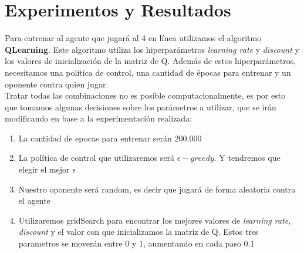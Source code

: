 \section{Experimentos y Resultados}
%
%
%
%
%


Para entrenar al agente que jugará al 4 en línea utilizamos el algoritmo \textbf{QLearning}. Este algoritmo utiliza los hiperparámetros \textit{learning rate} y \textit{discount} y los valores de inicialización de la matriz de Q. Además de estos hiperparámetros, necesitamos una política de control, una cantidad de épocas para entrenar y un oponente contra quien jugar.  \\

Tratar todas las combinaciones no es posible computacionalmente, es por esto que tomamos algunas decisiones sobre los parámetros a utilizar, que se irán modificando en base a la experimentación realizada:

\begin{enumerate}
\item La cantidad de epocas para entrenar serán 200.000
\item La política de control que utilizaremos será \textbf{$\epsilon-greedy$}. Y tendremos que elegir el mejor $\epsilon$
\item Nuestro oponente será random, es decir que jugará de forma aleatoria contra el agente
\item Utilizaremos gridSearch para encontrar los mejores valores de \textit{learning rate},  \textit{discount} y el valor con que inicializamos la matriz de Q. Estos tres parametros se moverán entre 0 y 1, aumentando en cada paso 0.1
\end{enumerate}

